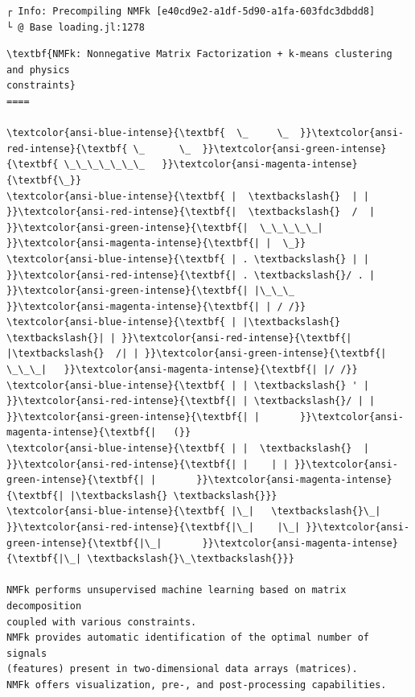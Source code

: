 \documentclass[11pt]{article}
\begin{document}
    
    \begin{Verbatim}[commandchars=\\\{\}]
┌ Info: Precompiling NMFk [e40cd9e2-a1df-5d90-a1fa-603fdc3dbdd8]
└ @ Base loading.jl:1278
    \end{Verbatim}

    \begin{Verbatim}[commandchars=\\\{\}]
\textbf{NMFk: Nonnegative Matrix Factorization + k-means clustering and physics
constraints}
====

\textcolor{ansi-blue-intense}{\textbf{  \_     \_  }}\textcolor{ansi-red-intense}{\textbf{ \_      \_  }}\textcolor{ansi-green-intense}{\textbf{ \_\_\_\_\_\_\_   }}\textcolor{ansi-magenta-intense}{\textbf{\_}}
\textcolor{ansi-blue-intense}{\textbf{ |  \textbackslash{}  | | }}\textcolor{ansi-red-intense}{\textbf{|  \textbackslash{}  /  | }}\textcolor{ansi-green-intense}{\textbf{|  \_\_\_\_\_| }}\textcolor{ansi-magenta-intense}{\textbf{| |  \_}}
\textcolor{ansi-blue-intense}{\textbf{ | . \textbackslash{} | | }}\textcolor{ansi-red-intense}{\textbf{| . \textbackslash{}/ . | }}\textcolor{ansi-green-intense}{\textbf{| |\_\_\_    }}\textcolor{ansi-magenta-intense}{\textbf{| | / /}}
\textcolor{ansi-blue-intense}{\textbf{ | |\textbackslash{} \textbackslash{}| | }}\textcolor{ansi-red-intense}{\textbf{| |\textbackslash{}  /| | }}\textcolor{ansi-green-intense}{\textbf{|  \_\_\_|   }}\textcolor{ansi-magenta-intense}{\textbf{| |/ /}}
\textcolor{ansi-blue-intense}{\textbf{ | | \textbackslash{} ' | }}\textcolor{ansi-red-intense}{\textbf{| | \textbackslash{}/ | | }}\textcolor{ansi-green-intense}{\textbf{| |       }}\textcolor{ansi-magenta-intense}{\textbf{|   (}}
\textcolor{ansi-blue-intense}{\textbf{ | |  \textbackslash{}  | }}\textcolor{ansi-red-intense}{\textbf{| |    | | }}\textcolor{ansi-green-intense}{\textbf{| |       }}\textcolor{ansi-magenta-intense}{\textbf{| |\textbackslash{} \textbackslash{}}}
\textcolor{ansi-blue-intense}{\textbf{ |\_|   \textbackslash{}\_| }}\textcolor{ansi-red-intense}{\textbf{|\_|    |\_| }}\textcolor{ansi-green-intense}{\textbf{|\_|       }}\textcolor{ansi-magenta-intense}{\textbf{|\_| \textbackslash{}\_\textbackslash{}}}

NMFk performs unsupervised machine learning based on matrix decomposition
coupled with various constraints.
NMFk provides automatic identification of the optimal number of signals
(features) present in two-dimensional data arrays (matrices).
NMFk offers visualization, pre-, and post-processing capabilities.
    \end{Verbatim}
\end{document}
